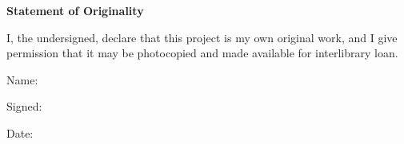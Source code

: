 \newpage

\vspace*{\fill}
\begin{center}
{\bf Statement of Originality}
\end{center}
\vspace{3\bigskipamount}
I, the undersigned, declare that this project is my own original work, and I give permission that it may be photocopied and made available for interlibrary loan.

\vspace{3\bigskipamount}
Name: 

\vspace{\bigskipamount}
Signed: 

\vspace{\bigskipamount}
Date: 

\vspace*{\fill}
